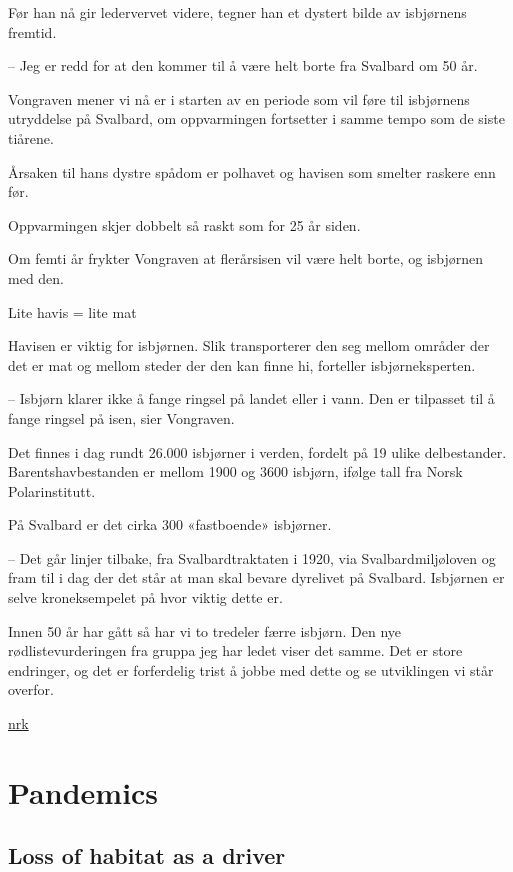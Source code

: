 \documentclass[
]{book}
\begin{document}
Før han nå gir ledervervet videre, tegner han et dystert bilde av isbjørnens fremtid.

-- Jeg er redd for at den kommer til å være helt borte fra Svalbard om 50 år.

Vongraven mener vi nå er i starten av en periode som vil føre til isbjørnens utryddelse på Svalbard, om oppvarmingen fortsetter i samme tempo som de siste tiårene.

Årsaken til hans dystre spådom er polhavet og havisen som smelter raskere enn før.

Oppvarmingen skjer dobbelt så raskt som for 25 år siden.

Om femti år frykter Vongraven at flerårsisen vil være helt borte, og isbjørnen med den.

Lite havis = lite mat

Havisen er viktig for isbjørnen. Slik transporterer den seg mellom områder der det er mat og mellom steder der den kan finne hi, forteller isbjørneksperten.

-- Isbjørn klarer ikke å fange ringsel på landet eller i vann. Den er tilpasset til å fange ringsel på isen, sier Vongraven.

Det finnes i dag rundt 26.000 isbjørner i verden, fordelt på 19 ulike delbestander. Barentshavbestanden er mellom 1900 og 3600 isbjørn, ifølge tall fra Norsk Polarinstitutt.

På Svalbard er det cirka 300 «fastboende» isbjørner.

-- Det går linjer tilbake, fra Svalbardtraktaten i 1920, via Svalbardmiljøloven og fram til i dag der det står at man skal bevare dyrelivet på Svalbard. Isbjørnen er selve kroneksempelet på hvor viktig dette er.

Innen 50 år har gått så har vi to tredeler færre isbjørn. Den nye rødlistevurderingen fra gruppa jeg har ledet viser det samme. Det er store endringer, og det er forferdelig trist å jobbe med dette og se utviklingen vi står overfor.

\href{https://www.nrk.no/tromsogfinnmark/mener-isbjorn-kan-vaere-utryddet-pa-svalbard-om-50-ar-1.15559199}{nrk}

\hypertarget{pandemics}{%
\chapter{Pandemics}\label{pandemics}}

\hypertarget{loss-of-habitat-as-a-driver}{%
\section{Loss of habitat as a driver}\label{loss-of-habitat-as-a-driver}}
\end{document}
